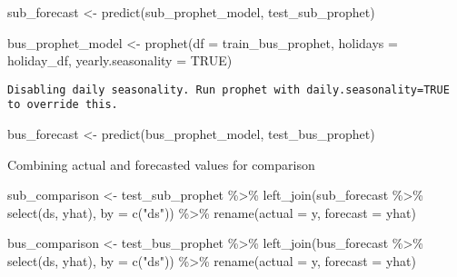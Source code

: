 \documentclass[
  letterpaper,
  DIV=11,
  numbers=noendperiod]{scrartcl}
\newenvironment{Shaded}{\begin{snugshade}}{\end{snugshade}}
\newcommand{\AttributeTok}[1]{\textcolor[rgb]{0.40,0.45,0.13}{#1}}
\newcommand{\ConstantTok}[1]{\textcolor[rgb]{0.56,0.35,0.01}{#1}}
\newcommand{\FunctionTok}[1]{\textcolor[rgb]{0.28,0.35,0.67}{#1}}
\newcommand{\NormalTok}[1]{\textcolor[rgb]{0.00,0.23,0.31}{#1}}
\newcommand{\OtherTok}[1]{\textcolor[rgb]{0.00,0.23,0.31}{#1}}
\newcommand{\SpecialCharTok}[1]{\textcolor[rgb]{0.37,0.37,0.37}{#1}}
\newcommand{\StringTok}[1]{\textcolor[rgb]{0.13,0.47,0.30}{#1}}
\begin{document}
\begin{Shaded}
\begin{Highlighting}[]
\NormalTok{sub\_forecast }\OtherTok{\textless{}{-}} \FunctionTok{predict}\NormalTok{(sub\_prophet\_model, test\_sub\_prophet)}

\NormalTok{bus\_prophet\_model }\OtherTok{\textless{}{-}} \FunctionTok{prophet}\NormalTok{(}\AttributeTok{df =}\NormalTok{ train\_bus\_prophet, }\AttributeTok{holidays =}\NormalTok{ holiday\_df, }\AttributeTok{yearly.seasonality =} \ConstantTok{TRUE}\NormalTok{)}
\end{Highlighting}
\end{Shaded}

\begin{verbatim}
Disabling daily seasonality. Run prophet with daily.seasonality=TRUE to override this.
\end{verbatim}

\begin{Shaded}
\begin{Highlighting}[]
\NormalTok{bus\_forecast }\OtherTok{\textless{}{-}} \FunctionTok{predict}\NormalTok{(bus\_prophet\_model, test\_bus\_prophet)}
\end{Highlighting}
\end{Shaded}

Combining actual and forecasted values for comparison

\begin{Shaded}
\begin{Highlighting}[]
\NormalTok{sub\_comparison }\OtherTok{\textless{}{-}}\NormalTok{ test\_sub\_prophet }\SpecialCharTok{\%\textgreater{}\%}
  \FunctionTok{left\_join}\NormalTok{(sub\_forecast }\SpecialCharTok{\%\textgreater{}\%} \FunctionTok{select}\NormalTok{(ds, yhat), }\AttributeTok{by =} \FunctionTok{c}\NormalTok{(}\StringTok{"ds"}\NormalTok{)) }\SpecialCharTok{\%\textgreater{}\%}
  \FunctionTok{rename}\NormalTok{(}\AttributeTok{actual =}\NormalTok{ y, }\AttributeTok{forecast =}\NormalTok{ yhat)}

\NormalTok{bus\_comparison }\OtherTok{\textless{}{-}}\NormalTok{ test\_bus\_prophet }\SpecialCharTok{\%\textgreater{}\%}
  \FunctionTok{left\_join}\NormalTok{(bus\_forecast }\SpecialCharTok{\%\textgreater{}\%} \FunctionTok{select}\NormalTok{(ds, yhat), }\AttributeTok{by =} \FunctionTok{c}\NormalTok{(}\StringTok{"ds"}\NormalTok{)) }\SpecialCharTok{\%\textgreater{}\%}
  \FunctionTok{rename}\NormalTok{(}\AttributeTok{actual =}\NormalTok{ y, }\AttributeTok{forecast =}\NormalTok{ yhat)}
\end{Highlighting}
\end{Shaded}
\end{document}
